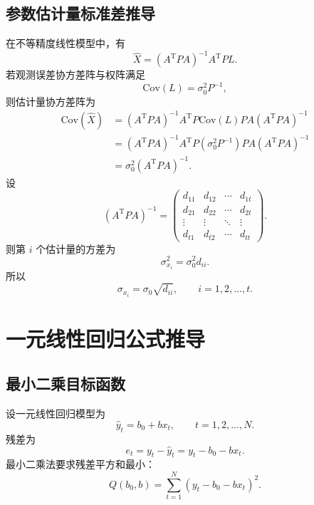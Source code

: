 \documentclass[UTF8,12pt,a4paper]{ctexart}
\newcommand{\Cov}{\mathrm{Cov}}
\newcommand{\T}{\mathrm{T}}
\begin{document}
\subsection{参数估计量标准差推导}
在不等精度线性模型中，有
\begin{equation*}
    \hat{X}=(A^\T P A)^{-1}A^\T P L .
\end{equation*}
若观测误差协方差阵与权阵满足
\begin{equation*}
    \Cov(L)=\sigma_0^2P^{-1},
\end{equation*}
则估计量协方差阵为
\begin{equation*}
\begin{aligned}
    \Cov(\hat{X})
    &=(A^\T P A)^{-1}A^\T P\Cov(L)P A(A^\T P A)^{-1} \\
    &=(A^\T P A)^{-1}A^\T P(\sigma_0^2P^{-1})P A(A^\T P A)^{-1} \\
    &=\sigma_0^2(A^\T P A)^{-1} .
\end{aligned}
\end{equation*}
设
\begin{equation*}
    (A^\T P A)^{-1}=
    \begin{pmatrix}
    d_{11}&d_{12}&\cdots&d_{1t}\\
    d_{21}&d_{22}&\cdots&d_{2t}\\
    \vdots&\vdots&\ddots&\vdots\\
    d_{t1}&d_{t2}&\cdots&d_{tt}
    \end{pmatrix} .
\end{equation*}
则第 $i$ 个估计量的方差为
\begin{equation*}
    \sigma_{x_i}^2=\sigma_0^2 d_{ii} .
\end{equation*}
所以
\begin{equation*}
    \sigma_{x_i}=\sigma_0\sqrt{d_{ii}},
    \qquad i=1,2,\ldots,t .
\end{equation*}

\newpage

\section{一元线性回归公式推导}

\subsection{最小二乘目标函数}
设一元线性回归模型为
\begin{equation*}
    \hat{y}_t=b_0+bx_t,
    \qquad t=1,2,\ldots,N .
\end{equation*}
残差为
\begin{equation*}
    e_t=y_t-\hat{y}_t=y_t-b_0-bx_t .
\end{equation*}
最小二乘法要求残差平方和最小：
\begin{equation*}
    Q(b_0,b)=\sum_{t=1}^{N}(y_t-b_0-bx_t)^2 .
\end{equation*}
\end{document}
